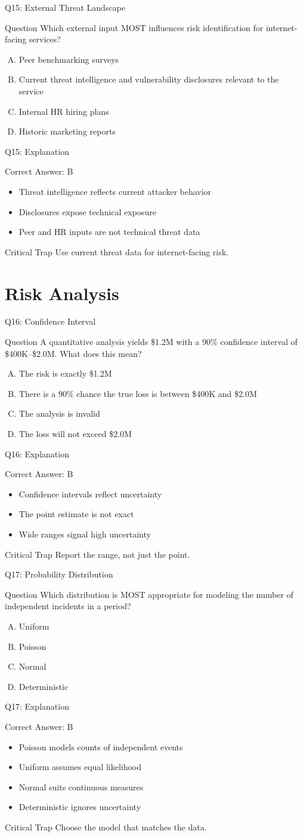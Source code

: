 \documentclass[aspectratio=169]{beamer}
\newcommand{\hq}[7]{%
	\begin{frame}{Q#1: #2}
		\begin{block}{Question}
			#3
		\end{block}
		\begin{enumerate}[(A)]
			#4
		\end{enumerate}
	\end{frame}
	\begin{frame}{Q#1: Explanation}
		\begin{block}{Correct Answer: #5}
			\begin{itemize}
				#6
			\end{itemize}
		\end{block}
		\begin{alertblock}{Critical Trap}
			#7
		\end{alertblock}
	\end{frame}
}
\begin{document}
	\hq{15}{External Threat Landscape}
	{Which external input MOST influences risk identification for internet-facing services?}
	{\item Peer benchmarking surveys
		\item Current threat intelligence and vulnerability disclosures relevant to the service
		\item Internal HR hiring plans
		\item Historic marketing reports}
	{B}
	{\item Threat intelligence reflects current attacker behavior
		\item Disclosures expose technical exposure
		\item Peer and HR inputs are not technical threat data}
	{Use current threat data for internet-facing risk.}
	
	\section{Risk Analysis}
	
	\hq{16}{Confidence Interval}
	{A quantitative analysis yields \$1.2M with a 90\% confidence interval of \$400K--\$2.0M. What does this mean?}
	{\item The risk is exactly \$1.2M
		\item There is a 90\% chance the true loss is between \$400K and \$2.0M
		\item The analysis is invalid
		\item The loss will not exceed \$2.0M}
	{B}
	{\item Confidence intervals reflect uncertainty
		\item The point estimate is not exact
		\item Wide ranges signal high uncertainty}
	{Report the range, not just the point.}
	
	\hq{17}{Probability Distribution}
	{Which distribution is MOST appropriate for modeling the number of independent incidents in a period?}
	{\item Uniform
		\item Poisson
		\item Normal
		\item Deterministic}
	{B}
	{\item Poisson models counts of independent events
		\item Uniform assumes equal likelihood
		\item Normal suits continuous measures
		\item Deterministic ignores uncertainty}
	{Choose the model that matches the data.}
	
\end{document}
